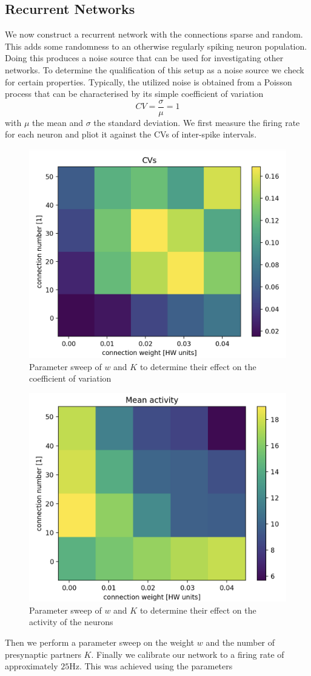 \documentclass[a4paper,twocolumn]{article}
\begin{document}
\subsection{Recurrent Networks}
We now construct a recurrent network with the connections sparse and random. 
This adds some randomness to an otherwise regularly spiking neuron population. 
Doing this produces a noise source that can be used for investigating other networks.
To determine the qualification of this setup as a noise source we check for certain 
properties.  Typically,  the utilized noise is obtained from a Poisson process 
that can be characterised by its simple coefficient of variation
\begin{equation}
	CV = \frac{\sigma}{\mu} = 1
\end{equation}
with $\mu$ the mean and $\sigma$ the standard deviation. We first measure the 
firing rate for each neuron and pliot it against the CVs of inter-spike intervals. 
\begin{figure}[ht]
    \centering
    \includegraphics[width=.5\textwidth]{figures/CV_sweep.png}
    \caption{Parameter sweep of $w$ and $K$ to determine their effect on the coefficient of variation }
    \label{fig:CV_sweep}
\end{figure}
\begin{figure}[ht]
    \centering
    \includegraphics[width=.5\textwidth]{figures/activity_sweep.png}
    \caption{Parameter sweep of $w$ and $K$ to determine their effect on the activity of the neurons}
    \label{fig:activity_sweep}
\end{figure}
Then we perform a parameter sweep on the weight $w$ and the number of presynaptic 
partners $K$.  %
Finally we calibrate our network to a firing rate of approximately $25$Hz.  This 
was achieved using the parameters %
\end{document}
